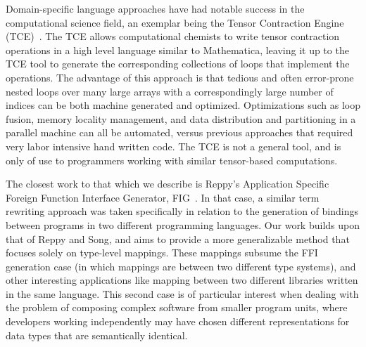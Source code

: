 Domain-specific language approaches have had notable success in the
computational science field, an exemplar being the Tensor Contraction Engine
(TCE)~\cite{baumgartner05synthesis}. The TCE allows computational chemists to
write tensor contraction operations in a high level language similar to
Mathematica, leaving it up to the TCE tool to generate the corresponding
collections of loops that implement the operations. The advantage of this
approach is that tedious and often error-prone nested loops over many large
arrays with a correspondingly large number of indices can be both machine
generated and optimized. Optimizations such as loop fusion, memory locality
management, and data distribution and partitioning in a parallel machine can all
be automated, versus previous approaches that required very labor intensive hand
written code. The TCE is not a general tool, and is only of use to programmers
working with similar tensor-based computations.

The closest work to that which we describe is Reppy's Application Specific
Foreign Function Interface Generator, FIG~\cite{reppy06fig}. In that case, a
similar term rewriting approach was taken specifically in relation to the
generation of bindings between programs in two different programming languages.
Our work builds upon that of Reppy and Song, and aims to provide a more
generalizable method that focuses solely on type-level mappings. These mappings
subsume the FFI generation case (in which mappings are between two different
type systems), and other interesting applications like mapping between two
different libraries written in the same language. This second case is of
particular interest when dealing with the problem of composing complex software
from smaller program units, where developers working independently may have
chosen different representations for data types that are semantically identical.

% 
% 
% 
% 
% 
